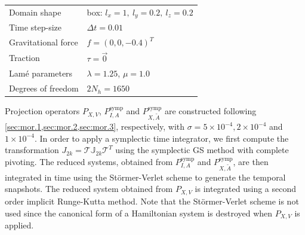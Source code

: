 \vspace{0.5cm}
\begin{center}
\begin{tabular}{|l|l|}
\hline
Domain shape & box: $l_x = 1,\ l_y = 0.2,\ l_z = 0.2$ \\
Time step-size & $\Delta t = 0.01$ \\
Gravitational force & $f = (0,0,-0.4)^T$ \\
Traction & $\tau = \vec 0$ \\
Lam\'e parameters & $\lambda = 1.25$, $\mu = 1.0$ \\
Degrees of freedom & $2N_{h} = 1650$ \\
\hline
\end{tabular}
\end{center}
\vspace{0.5cm}
Projection operators $P_{X,V}$, $P^{\text{symp}}_{I,A}$ and $P^{\text{symp}}_{X,\tilde A}$ are constructed following \cref{sec:mor.1,sec:mor.2,sec:mor.3}, respectively, with $\sigma = 5\times 10^{-4}, 2\times 10^{-4}$ and $1\times 10^{-4}$. In order to apply a symplectic time integrator, we first compute the transformation $J_{2k} = \mathcal T \mathbb J_{2k} \mathcal T^T$ using the symplectic GS method with complete pivoting. The reduced systems, obtained from $P^{\text{symp}}_{I,A}$ and $P^{\text{symp}}_{X,\tilde A}$, are then integrated in time using the St\"ormer-Verlet scheme to generate the temporal snapshots. The reduced system obtained from $P_{X,V}$ is integrated using a second order implicit Runge-Kutta method. Note that the St\"ormer-Verlet scheme is not used since the canonical form of a Hamiltonian system is destroyed when $P_{X,V}$ is applied.

